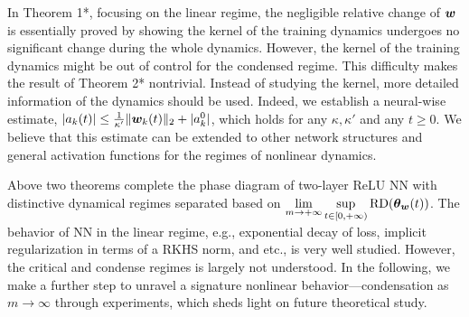 \documentclass{article}
\begin{document}
In Theorem 1*, focusing on the linear regime, the negligible relative change of $\bm{w}$ is essentially proved by showing the kernel of the training dynamics undergoes no significant change during the whole dynamics. However, the kernel of the training dynamics might be out of control for the condensed regime. This difficulty makes the result of Theorem 2* nontrivial. Instead of studying the kernel, more detailed information of the dynamics should be used. Indeed, we establish a neural-wise estimate, $\lvert a_k(t)\rvert\leq \frac{1}{\kappa'}\lVert\bm{w}_k(t)\rVert_2+\lvert a_k^0\rvert$, which holds for any $\kappa,\kappa'$ and any $t\geq 0$. We believe that this estimate can be extended to other network structures and general activation functions for the regimes of nonlinear dynamics.

Above two theorems complete the phase diagram of two-layer ReLU NN with distinctive dynamical regimes separated based on $\lim\limits_{m\to+\infty}\sup\limits_{t\in[0,+\infty)}\mathrm{RD}(\bm{\theta}_{\bm{w}}(t))$. The behavior of NN in the linear regime, e.g., exponential decay of loss, implicit regularization in terms of a RKHS norm, and etc., is very well studied. However, the critical and condense regimes is largely not understood. In the following, we make a further step to unravel a signature nonlinear behavior---condensation as $m\to\infty$ through experiments, which sheds light on future theoretical study.


\end{document}
